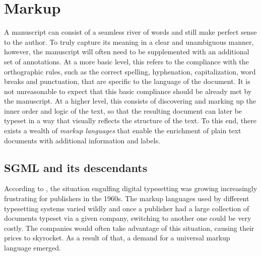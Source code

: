 \documentclass[b5paper]{book}
\begin{document}
    \chapter{Markup}
      A manuscript can consist of a seamless river of words and still make
      perfect sense to the author. To truly capture its meaning in a clear and
      unambiguous manner, however, the manuscript will often need to be
      supplemented with an additional set of annotations. At a more basic level,
      this refers to the compliance with the orthographic rules, such as the
      correct spelling, hyphenation, capitalization, word breaks and
      punctuation, that are specific to the language of the document. It is not
      unreasonable to expect that this basic compliance should be already met by
      the manuscript. At a higher level, this consists of discovering and
      marking up the inner order and logic of the text, so that the resulting
      document can later be typeset in a way that visually reflects the
      structure of the text. To this end, there exists a wealth of \emph{markup
      languages} that enable the enrichment of plain text documents with
      additional information and labels.

      \section{SGML and its descendants}
        According to \cite{hlava11}, the situation engulfing digital typesetting
        was growing increasingly frustrating for publishers in the 1960s. The
        markup languages used by different typesetting systems varied wildly and
        once a publisher had a large collection of documents typeset via a given
        company, switching to another one could be very costly. The companies
        would often take advantage of this situation, causing their prices to
        skyrocket. As a result of that, a demand for a universal markup language
        emerged.
\end{document}
